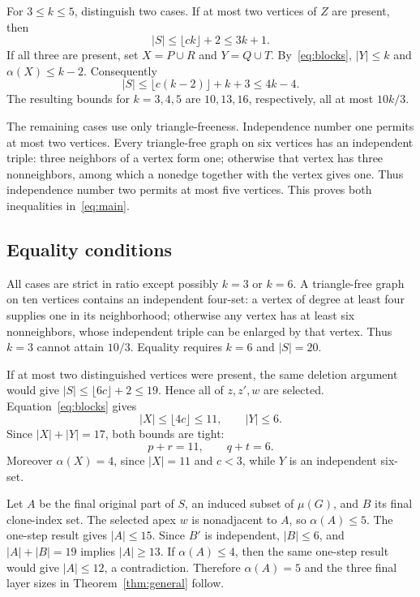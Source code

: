 \documentclass[11pt,letterpaper]{article}
\theoremstyle{remark}
\newcommand{\abs}[1]{\lvert #1\rvert}
\begin{document}
For $3\le k\le5$, distinguish two cases. If at most two vertices of $Z$
are present, then
\begin{equation}\label{eq:fewapices}
 \abs S\le\lfloor ck\rfloor+2\le3k+1.
\end{equation}
If all three are present, set $X=P\cup R$ and $Y=Q\cup T$.
By~\eqref{eq:blocks}, $\abs Y\le k$ and $\alpha(X)\le k-2$.
Consequently
\begin{equation}\label{eq:allapices}
 \abs S\le\lfloor c(k-2)\rfloor+k+3\le4k-4.
\end{equation}
The resulting bounds for $k=3,4,5$ are $10,13,16$, respectively, all at
most $10k/3$.

The remaining cases use only triangle-freeness. Independence number one
permits at most two vertices. Every triangle-free graph on six vertices
has an independent triple: three neighbors of a vertex form one;
otherwise that vertex has three nonneighbors, among which a nonedge
together with the vertex gives one. Thus independence number two permits
at most five vertices. This proves both inequalities in~\eqref{eq:main}.

\subsection{Equality conditions}
All cases are strict in ratio except possibly $k=3$ or $k=6$.
A triangle-free graph on ten vertices contains an independent four-set:
a vertex of degree at least four supplies one in its neighborhood;
otherwise any vertex has at least six nonneighbors, whose independent
triple can be enlarged by that vertex. Thus $k=3$ cannot attain $10/3$.
Equality requires $k=6$ and $\abs S=20$.

If at most two distinguished vertices were present, the same deletion
argument would give $\abs S\le\lfloor6c\rfloor+2\le19$. Hence all of $z,z',w$ are
selected. Equation~\eqref{eq:blocks} gives
\[
 \abs X\le\lfloor4c\rfloor\le11,\qquad \abs Y\le6.
\]
Since $\abs X+\abs Y=17$, both bounds are tight:
\begin{equation}\label{eq:balance}
 p+r=11,\qquad q+t=6.
\end{equation}
Moreover $\alpha(X)=4$, since $\abs X=11$ and $c<3$, while $Y$ is an
independent six-set.

Let $A$ be the final original part of $S$, an induced subset of $\mu(G)$,
and $B$ its final clone-index set. The selected apex $w$ is nonadjacent to
$A$, so $\alpha(A)\le5$. The one-step result gives $\abs A\le15$.
Since $B'$ is independent, $\abs B\le6$, and
$\abs A+\abs B=19$ implies $\abs A\ge13$. If $\alpha(A)\le4$, then the
same one-step result would give $\abs A\le12$, a contradiction.
Therefore $\alpha(A)=5$ and the three final layer sizes in
Theorem~\ref{thm:general} follow.
\end{document}
